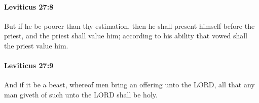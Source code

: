 		\paragraph{Leviticus 27:8} %
			\label{LEVITICUS-27-8}

			But if he be poorer than thy estimation, then he shall present himself before the priest, and the priest shall value him; according to his ability that vowed shall the priest value him.


		\paragraph{Leviticus 27:9} %
			\label{LEVITICUS-27-9}

			And if it be a beast, whereof men bring an offering unto the LORD, all that any man giveth of such unto the LORD shall be holy.


